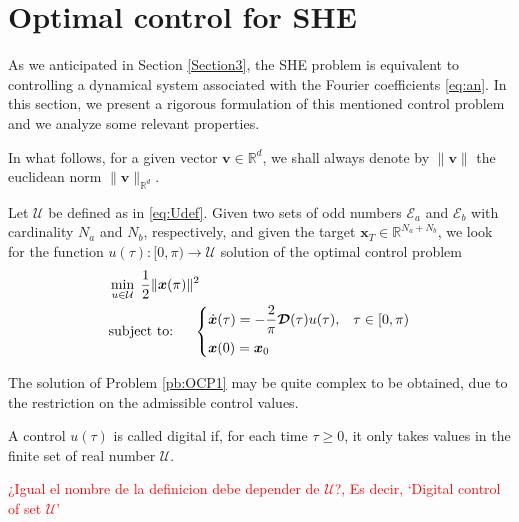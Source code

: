 \section{Optimal control for SHE}\label{Section4}

As we anticipated in Section \ref{Section3}, the SHE problem is equivalent to controlling a dynamical system associated with the Fourier coefficients \eqref{eq:an}. In this section, we present a rigorous formulation of this mentioned control problem and we analyze some relevant properties. 

In what follows, for a given vector $\bm{v}\in\mathbb{R}^d$, we shall always denote by $\|\bm{v}\|$ the euclidean norm $\|\bm{v}\|_{\mathbb{R}^d}$.
\newline


\begin{problem}\label{pb:OCP1}
Let $\mathcal U$ be defined as in \eqref{eq:Udef}. Given two sets of odd numbers $\mathcal {E}_a $ and $\mathcal {E}_b $ with cardinality $N_a$ and $N_b$, respectively, and given the target $\bm{x}_T\in \mathbb{R}^{N_a+N_b}$, we look for the function $u(\tau):[0,\pi)\to \mathcal U$ solution of the optimal control problem  
\begin{align*}
	&\min_{u \in \mathcal{U}}\;\frac 12 \|\bm{x}(\pi)\|^2
	\\
    &\notag \text{subject to: }\quad \begin{cases}
            \displaystyle \dot{\bm{x}}(\tau) = -\frac 2\pi\bm{\mathcal{D}}(\tau) u(\tau),  & \tau \in [0,\pi)\\[6pt]
            \bm{x}(0) = \bm{x}_0
    \end{cases}
    \end{align*}
\end{problem}
The solution of Problem \ref{pb:OCP1} may be quite complex to be obtained, due to the restriction on the admissible control values. 

\begin{definition}
A control $u(\tau)$ is called digital if, for each time $\tau\geq 0$, it only takes values in the finite set of real number $\mathcal{U}$.  
\end{definition}
\textcolor{red}{¿Igual el nombre de la definicion debe depender de $\mathcal{U}$?, Es decir, `Digital control of set $\mathcal{U}$'}


